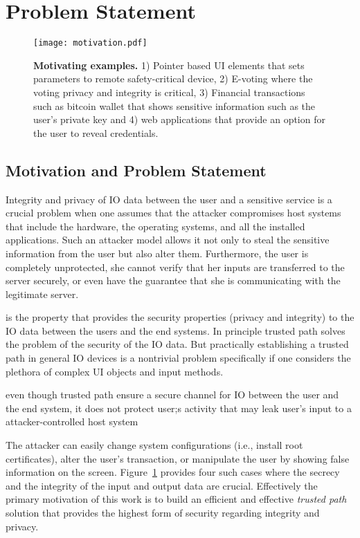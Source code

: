 \section{Problem Statement}
\label{sec:problemStatement}

\begin{figure}[t]
\centering
\texttt{[image: motivation.pdf]}
\caption{\textbf{Motivating examples.} 1) Pointer based UI elements that sets parameters to remote safety-critical device, 2) E-voting where the voting privacy and integrity is critical, 3) Financial transactions such as bitcoin wallet that shows sensitive information such as the user's private key and 4) web applications that provide an option for the user to reveal credentials.}
\label{fig:motivation}
\centering
\end{figure}






\subsection{Motivation and Problem Statement}

Integrity and privacy of IO data between the user and a sensitive service is a crucial problem when one assumes that the attacker compromises host systems that include the hardware, the operating systems, and all the installed applications. Such an attacker model allows it not only to steal the sensitive information from the user but also alter them. Furthermore, the user is completely unprotected, she cannot verify that her inputs are transferred to the server securely, or even have the guarantee that she is communicating with the legitimate server. 

 is the property that provides the security properties (privacy and integrity) to the IO data between the users and the end systems. In principle trusted path solves the problem of the security of the IO data. But practically establishing a trusted path in general IO devices is a nontrivial problem specifically if one considers the plethora of complex UI objects and input methods.

 even though trusted path ensure a secure channel for IO between the user and the end system, it does not protect user;s activity that may leak user's input to a attacker-controlled host system

The attacker can easily change system configurations (i.e., install root certificates), alter the user's transaction, or manipulate the user by showing false information on the screen. Figure~\ref{fig:motivation} provides four such cases where the secrecy and the integrity of the input and output data are crucial. Effectively the primary motivation of this work is to build an efficient and effective \emph{trusted path} solution that provides the highest form of security regarding integrity and privacy.  

